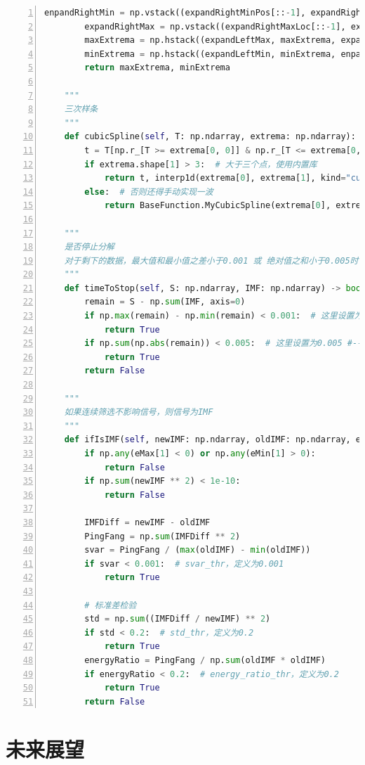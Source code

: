 \documentclass[cs4size,a4paper]{ctexart}
\numberwithin{equation}{section}
\numberwithin{table}{section}
\numberwithin{figure}{section}
\begin{document}
\begin{lstlisting}[language={python},
numbers=left,
numberstyle=\tiny\monaco,
basicstyle=\footnotesize\monaco]
        enpandRightMin = np.vstack((expandRightMinPos[::-1], expandRightMinVal[::-1]))
        expandRightMax = np.vstack((expandRightMaxLoc[::-1], expandRightMaxVal[::-1]))
        maxExtrema = np.hstack((expandLeftMax, maxExtrema, expandRightMax))
        minExtrema = np.hstack((expandLeftMin, minExtrema, enpandRightMin))
        return maxExtrema, minExtrema

    """
    三次样条
    """
    def cubicSpline(self, T: np.ndarray, extrema: np.ndarray):
        t = T[np.r_[T >= extrema[0, 0]] & np.r_[T <= extrema[0, -1]]]
        if extrema.shape[1] > 3:  # 大于三个点，使用内置库
            return t, interp1d(extrema[0], extrema[1], kind="cubic")(t)
        else:  # 否则还得手动实现一波
            return BaseFunction.MyCubicSpline(extrema[0], extrema[1], t)

    """
    是否停止分解
    对于剩下的数据，最大值和最小值之差小于0.001 或 绝对值之和小于0.005时，停止分解
    """
    def timeToStop(self, S: np.ndarray, IMF: np.ndarray) -> bool:
        remain = S - np.sum(IMF, axis=0)
        if np.max(remain) - np.min(remain) < 0.001:  # 这里设置为0.001 #--------------------
            return True
        if np.sum(np.abs(remain)) < 0.005:  # 这里设置为0.005 #--------------------
            return True
        return False

    """
    如果连续筛选不影响信号，则信号为IMF
    """
    def ifIsIMF(self, newIMF: np.ndarray, oldIMF: np.ndarray, eMax: np.ndarray, eMin: np.ndarray) -> bool:
        if np.any(eMax[1] < 0) or np.any(eMin[1] > 0):
            return False
        if np.sum(newIMF ** 2) < 1e-10:
            return False

        IMFDiff = newIMF - oldIMF
        PingFang = np.sum(IMFDiff ** 2)
        svar = PingFang / (max(oldIMF) - min(oldIMF))
        if svar < 0.001:  # svar_thr，定义为0.001
            return True

        # 标准差检验
        std = np.sum((IMFDiff / newIMF) ** 2)
        if std < 0.2:  # std_thr，定义为0.2
            return True
        energyRatio = PingFang / np.sum(oldIMF * oldIMF)
        if energyRatio < 0.2:  # energy_ratio_thr，定义为0.2
            return True
        return False
\end{lstlisting}


\section{未来展望}
\end{document}
